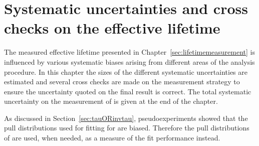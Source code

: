 \chapter{{\bf Systematic uncertainties and cross checks on the effective lifetime}}
\label{sec:systematics}
The measured \bsmumu effective lifetime presented in Chapter~\ref{sec:lifetimemeasurement} is influenced by various systematic biases arising from different areas of the analysis procedure. In this chapter the sizes of the different systematic uncertainties are estimated and several cross checks are made on the measurement strategy to ensure the uncertainty quoted on the final result is correct. The total systematic uncertainty on the measurement of \tmumu is given at the end of the chapter.

As discussed in Section~\ref{sec:tauORinvtau}, pseudoexperiments showed that the pull distributions used for fitting for \tmumu are biased. Therefore the pull distributions of \Gmumu are used, when needed, as a measure of the fit performance instead.

